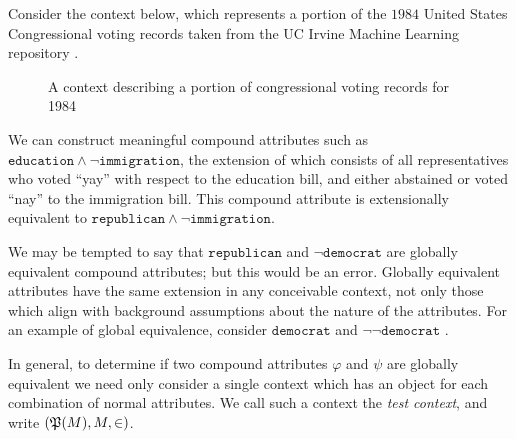 \begin{example}
	Consider the context below, which represents a portion of the $1984$ United States Congressional voting records taken
	from the UC Irvine Machine Learning repository \cite{congressional_voting_records_105}.

	\begin{figure}[H]
		\centering
		\begin{cxt}
			\label{cxt:voting}   
			    
			  
		\end{cxt}
		\caption{A context describing a portion of congressional voting records for 1984}
		\label{figure:voting-records}
	\end{figure}

	We can construct meaningful compound attributes such as $\texttt{education}\land \neg \texttt{immigration}$, the
	extension of which consists of all representatives who voted ``yay'' with respect to the education bill, and either abstained
	or voted ``nay'' to the immigration bill. This compound attribute is extensionally equivalent to
	$\texttt{republican}\land \neg \texttt{immigration}$.

	We may be tempted to say that $\texttt{republican}$ and $\neg \texttt{democrat}$ are globally equivalent compound
	attributes; but this would be an error. Globally equivalent attributes have the same extension in any conceivable
	context, not only those which align with background assumptions about the nature of the attributes. For an example of
	global equivalence, consider $\texttt{democrat}$ and $\neg \neg \texttt{democrat }$.
\end{example}

In general, to determine if two compound attributes $\varphi$ and $\psi$ are globally equivalent we need only consider a
single context which has an object for each combination of normal attributes. We call such a context the \textit{test
context}, and write $(\mathfrak{P}({M}),M,\in)$.

